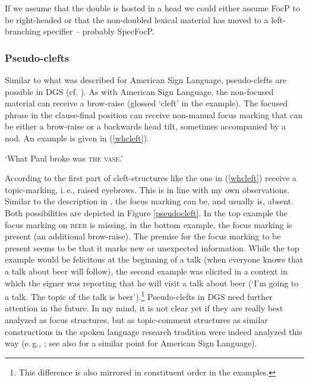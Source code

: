 \noindent If we assume that the double is hosted in a head we could either assume FocP to be right-headed or that the non-doubled lexical material has moved to a left-branching specifier -- probably SpecFocP. 



\subsubsection{Pseudo-clefts}
Similar to what was described for American Sign Language, pseudo-clefts are possible in DGS (cf. \citealt[397]{happ2014vork}). As with American Sign Language, the non-focused material can receive a brow-raise (glossed `cleft' in the example). The focused phrase in the clause-final position can receive non-manual focus marking that can be either a brow-raise or a backwards head tilt, sometimes accompanied by a nod. An example is given in (\ref{whcleft}).%

\begin{exe}
\ex {} 
\glt `What Paul broke was \textsc{the vase}.' \label{whcleft}
\end{exe}

\noindent According to \citet[397]{happ2014vork} the first part of cleft-structures like the one in (\ref{whcleft}) receive a topic-marking, i.\,e., raised eyebrows. This is in line with my own observations. Similar to the description in \citet[397]{happ2014vork}, the focus marking can be, and usually is, absent. Both possibilities are depicted in Figure \ref{pseudocleft}. In the top example the focus marking on \textsc{beer} is missing, in the bottom example, the focus marking is present (an additional brow-raise). The premise for the focus marking to be present seems to be that it marks new or unexpected information. While the top example would be felicitous at the beginning of a talk (when everyone knows that a talk about beer will follow), the second example was elicited in a context in which the signer was reporting that he will visit a talk about beer (`I'm going to a talk. The topic of the talk is beer').\footnote{ This difference is also mirrored in constituent order in the examples.} Pseudo-clefts in DGS need further attention in the future. In my mind, it is not clear yet if they are really best analyzed as focus structures, but as topic-comment structures as similar constructions in the spoken language research tradition were indeed analyzed this way (e.\,g., \citealt{prince1978,gast2014}; see also \citealt{caponigro2011ask} for a similar point for American Sign Language).

